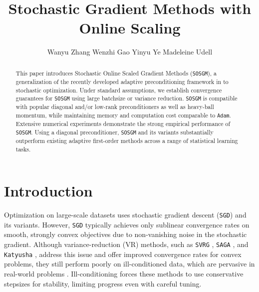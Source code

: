 \documentclass{article}
\date{}
\theoremstyle{definition}
\newcommand{\sosgm}{\texttt{SOSGM}}
\newcommand{\svrg}{\texttt{SVRG}}
\newcommand{\saga}{\texttt{SAGA}}
\newcommand{\sgd}{\texttt{SGD}}
\begin{document}
\author{Wanyu Zhang\footnotemark[1]\quad 
Wenzhi Gao\footnotemark[1] \quad
Yinyu Ye\footnotemark[1] \quad
Madeleine Udell\footnotemark[1]
}

\renewcommand{\thefootnote}{\fnsymbol{footnote}}
\renewcommand{\thefootnote}{\arabic{footnote}}

\title{Stochastic Gradient Methods with Online Scaling}

\maketitle

\begin{abstract}

This paper introduces Stochastic Online Scaled Gradient Methods ({\sosgm}), a generalization of the recently developed adaptive preconditioning framework in \cite{gao2025gradient,chu2025gradient} to stochastic optimization.
Under standard assumptions, we establish convergence guarantees for {\sosgm} using large batchsize or variance reduction. {\sosgm} is compatible with popular diagonal and/or low-rank preconditioners as well as heavy-ball momentum, while maintaining memory and computation cost comparable to \texttt{Adam}.
Extensive numerical experiments demonstrate the strong empirical performance of {\sosgm}. Using a diagonal preconditioner, {\sosgm} and its variants substantially outperform existing adaptive first-order methods across a range of statistical learning tasks.

\end{abstract}

\section{Introduction}
\label{sec:intro}

Optimization on large-scale datasets uses stochastic gradient descent ({\sgd}) and its variants. However, {\sgd} typically achieves only sublinear convergence rates on smooth, strongly convex objectives due to non-vanishing noise in the stochastic gradient. 
Although variance-reduction (VR) methods, such as {\svrg} \cite{johnson2013accelerating}, {\saga} \cite{defazio2014saga}, and \texttt{Katyusha} \cite{allen2018katyusha}, address this issue and offer improved convergence rates for convex problems, they still perform poorly on ill-conditioned data, which are pervasive in real-world problems \cite[Table 2]{frangella2024sketchysgd}. 
Ill-conditioning forces these methods to use conservative stepsizes for stability, limiting progress even with careful tuning.
\end{document}
